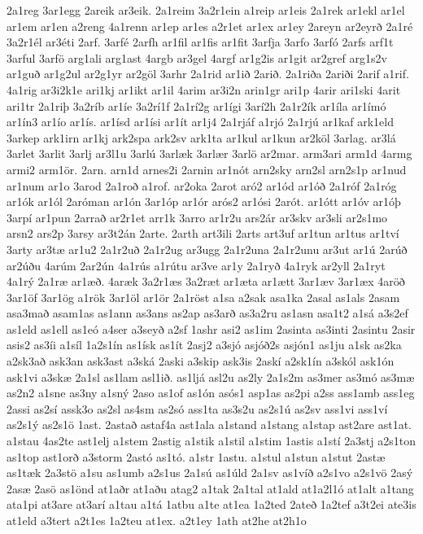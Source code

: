 {2a1reg
3ar1egg
2areik
ar3eik.
2a1reim
3a2r1ein
a1reip
ar1eis
2a1rek
ar1ekl
ar1el
ar1em
ar1en
a2reng
4a1renn
ar1ep
ar1es
a2r1et
ar1ex
ar1ey
2areyn
ar2eyrð
2a1ré
3a2r1él
ar3éti
2arf.
3arfé
2arfh
ar1fil
ar1fis
ar1fit
3arfja
3arfo
3arfó
2arfs
arf1t
3arful
3arfö
arg1ali
arg1ast
4argb
ar3gel
4argf
ar1g2is
ar1git
ar2gref
arg1s2v
ar1guð
ar1g2ul
ar2g1yr
ar2göl
3arhr
2a1rid
ar1ið
2arið.
2a1riða
2ariði
2arif
a1rif.
4a1rig
ar3i2k1e
ari1kj
ar1ikt
ar1il
4arim
ar3i2n
arin1gr
ari1p
4arir
ari1ski
4arit
ari1tr
2a1riþ
3a2ríb
ar1íe
3a2rí1f
2a1rí2g
ar1ígi
3arí2h
2a1r2ík
ar1íla
ar1ímó
ar1ín3
ar1ío
ar1ís.
ar1ísd
ar1ísi
ar1ít
ar1j4
2a1rjáf
a1rjó
2a1rjú
ar1kaf
ark1eld
3arkep
ark1irn
ar1kj
ark2spa
ark2sv
ark1ta
ar1kul
ar1kun
ar2köl
3arlag.
ar3lá
3arlet
3arlit
3arlj
ar3l1u
3arlú
3arlæk
3arlær
3arlö
ar2mar.
arm3ari
arm1d
4armg
armi2
arm1ör.
2arn.
arn1d
arnes2i
2arnin
ar1nót
arn2sky
arn2sl
arn2s1p
ar1nud
ar1num
ar1o
3arod
2a1roð
a1rof.
ar2oka
2arot
aró2
ar1ód
ar1óð
2a1róf
2a1róg
ar1ók
ar1ól
2aróman
ar1ón
3ar1óp
ar1ór
arós2
ar1ósi
2arót.
ar1ótt
ar1óv
ar1óþ
3arpí
ar1pun
2arrað
ar2r1et
arr1k
3arro
ar1r2u
ars2ár
ar3skv
ar3sli
ar2s1mo
arsn2
ars2p
3arsy
ar3t2án
2arte.
2arth
art3ili
2arts
art3uf
ar1tun
ar1tus
ar1tví
3arty
ar3tæ
ar1u2
2a1r2uð
2a1r2ug
ar3ugg
2a1r2una
2a1r2unu
ar3ut
ar1ú
2arúð
ar2úðu
4arúm
2ar2ún
4a1rús
a1rútu
ar3ve
ar1y
2a1ryð
4a1ryk
ar2yll
2a1ryt
4a1rý
2a1ræ
ar1æð.
4aræk
3a2r1æs
3a2ræt
ar1æta
ar1ætt
3ar1æv
3ar1æx
4aröð
3ar1öf
3ar1ög
a1rök
3ar1öl
ar1ör
2a1röst
a1sa
a2sak
asa1ka
2asal
as1als
2asam
asa3mað
asam1as
as1ann
as3ans
as2ap
as3arð
as3a2ru
as1asn
asa1t2
a1sá
a3s2ef
as1eld
as1ell
as1eó
a4ser
a3seyð
a2sf
1ashr
asi2
as1im
2asinta
as3inti
2asintu
2asir
asis2
as3íi
a1síl
1a2s1ín
as1ísk
as1ít
2asj2
a3sjó
asjóð2s
asjón1
as1ju
a1sk
as2ka
a2sk3að
ask3an
ask3ast
a3ská
2aski
a3skip
ask3is
2askí
a2sk1ín
a3skól
ask1ón
ask1vi
a3skæ
2a1sl
as1lam
asl1ið.
as1ljá
asl2u
as2ly
2a1s2m
as3mer
as3mó
as3mæ
as2n2
a1sne
as3ny
a1sný
2aso
as1of
as1ón
asós1
asp1as
as2pi
a2ss
ass1amb
ass1eg
2assi
as2sí
assk3o
as2sl
as4sm
as2só
ass1ta
as3s2u
as2s1ú
as2sv
ass1vi
ass1ví
as2s1ý
as2s1ö
1ast.
2astað
astaf4a
ast1ala
a1stand
a1stang
a1stap
ast2are
ast1at.
a1stau
4as2te
ast1elj
a1stem
2astig
a1stik
a1stil
a1stim
1astis
a1stí
2a3stj
a2s1ton
as1top
ast1orð
a3storm
2astó
as1tó.
a1str
1astu.
a1stul
a1stun
a1stut
2astæ
as1tæk
2a3stö
a1su
as1umb
a2s1us
2a1sú
as1úld
2a1sv
as1víð
a2s1vo
a2s1vö
2asý
2asæ
2asö
as1önd
at1aðr
at1aðu
atag2
a1tak
2a1tal
at1ald
at1a2l1ó
at1alt
a1tang
ata1pi
at3are
at3arí
a1tau
a1tá
1atbu
a1te
at1ea
1a2ted
2ateð
1a2tef
a3t2ei
ate3is
at1eld
a3tert
a2t1es
1a2teu
at1ex.
a2t1ey
1ath
at2he
at2h1o
}
